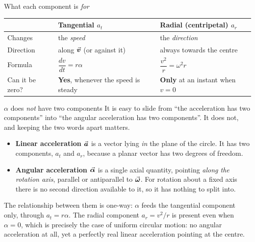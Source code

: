\begin{tablebox}{What each component is \emph{for}}
\begin{center}
\begin{tabular}{@{}lll@{}}
\toprule
& \textbf{Tangential} $a_t$ & \textbf{Radial (centripetal)} $a_r$\\
\midrule
Changes & the \emph{speed} & the \emph{direction}\\
Direction & along $\vec{\bm{v}}$ (or against it) & always towards the centre\\
Formula & $\dfrac{dv}{dt}=r\alpha$ & $\dfrac{v^{2}}{r}=\omega^{2}r$\\
Can it be zero? & \textbf{Yes}, whenever the speed is steady & \textbf{Only} at an instant when $v=0$\\
\bottomrule
\end{tabular}
\end{center}
\end{tablebox}

\begin{trapbox}{$\alpha$ does \emph{not} have two components}
It is easy to slide from ``the acceleration has two components'' into ``the angular acceleration has
two components''. It does not, and keeping the two words apart matters.
\begin{itemize}
\item \textbf{Linear acceleration $\vec{\bm{a}}$} is a vector lying \emph{in} the plane of the circle. It has
      two components, $a_t$ and $a_r$, because a planar vector has two degrees of freedom.
\item \textbf{Angular acceleration $\vec{\bm{\alpha}}$} is a single axial quantity, pointing \emph{along the
      rotation axis}, parallel or antiparallel to $\vec{\bm{\omega}}$. For rotation about a fixed axis there is
      no second direction available to it, so it has nothing to split into.
\end{itemize}
The relationship between them is one-way: $\alpha$ feeds the tangential component only, through
$a_t=r\alpha$. The radial component $a_r=v^{2}/r$ is present even when $\alpha=0$, which is precisely
the case of uniform circular motion: no angular acceleration at all, yet a perfectly real linear
acceleration pointing at the centre.
\end{trapbox}


